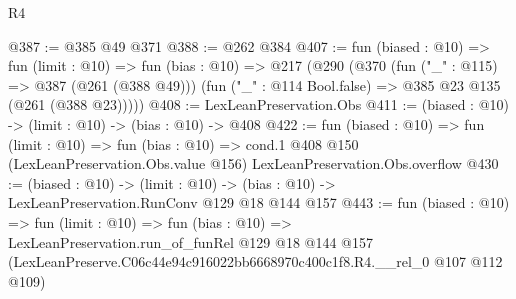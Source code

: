 \begin{lexlean}{R4}
\begin{coremodule}
@387 := @385 @49 @371
@388 := @262 @384
@407 := fun (biased : @10) =>
  fun (limit : @10) =>
  fun (bias : @10) =>
  @217
    (@290
      (@370
        (fun ("_" : @115) => @387 (@261 (@388 @49)))
        (fun ("_" : @114 Bool.false) => @385 @23 @135 (@261 (@388 @23)))))
@408 := LexLeanPreservation.Obs
@411 := (biased : @10) -> (limit : @10) -> (bias : @10) -> @408
@422 := fun (biased : @10) =>
  fun (limit : @10) =>
  fun (bias : @10) =>
  cond.{1} @408 @150 (LexLeanPreservation.Obs.value @156) LexLeanPreservation.Obs.overflow
@430 := (biased : @10) ->
  (limit : @10) -> (bias : @10) -> LexLeanPreservation.RunConv @129 @18 @144 @157
@443 := fun (biased : @10) =>
  fun (limit : @10) =>
  fun (bias : @10) =>
  LexLeanPreservation.run_of_funRel
    @129
    @18
    @144
    @157
    (LexLeanPreserve.C06c44e94c916022bb6668970c400c1f8.R4.__rel_0 @107 @112 @109)
\end{coremodule}
\end{lexlean}
